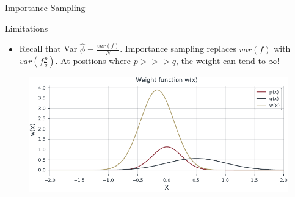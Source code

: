 \documentclass{beamer}
\begin{document}
\begin{section}{Importance Sampling}
    \begin{frame}{Limitations}
        \begin{itemize}
            \item Recall that Var $\hat{\phi} = \frac{var(f)}{N}$. Importance sampling replaces $var(f)$ with $var(f\frac{p}{q})$. At positions where $p>>>q$, the weight can tend to $\infty$!
        \end{itemize}
        \begin{figure}
                \centering
                \includegraphics[scale=0.8]{../figures/importance_sampling_weight_function.pdf}
        \end{figure}
    \end{frame}
\end{section}
\end{document}
